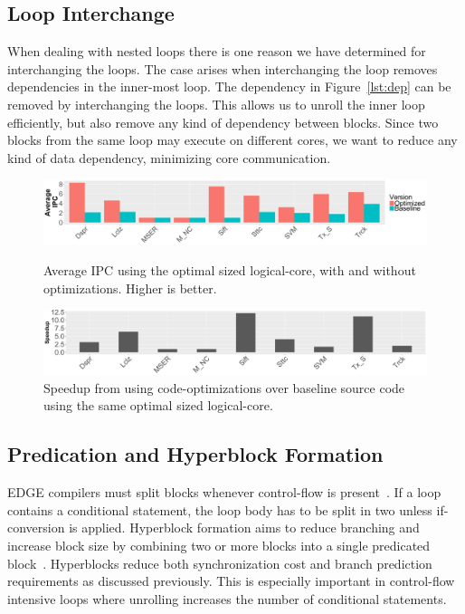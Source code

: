 \subsection{Loop Interchange}
When dealing with nested loops there is one reason we have determined for interchanging the loops.
The case arises when interchanging the loop removes dependencies in the inner-most loop.
The dependency in Figure~\ref{lst:dep} can be removed by interchanging the loops. 
This allows us to unroll the inner loop efficiently, but also remove any kind of dependency between blocks.
Since two blocks from the same loop may execute on different cores, we want to reduce any kind of data dependency, minimizing core communication.

\begin{figure}[t]
     \centering
     \includegraphics[width=\textwidth]{cases-paper/graphics/Exploration/ipc_comp.pdf}
\vspace*{-8mm}
     \caption{Average IPC using the optimal sized logical-core, with and without optimizations. Higher is better.}
     \label{fig:ipccom}
     \vspace{0.5em}
\vspace{5mm}
    \centering
    \includegraphics[width=\textwidth]{cases-paper/graphics/Exploration/comp_speed.pdf}
\vspace*{-8mm}
    \caption{Speedup from using code-optimizations over baseline source code using the same optimal sized logical-core.}
    \label{fig:speedcomp}
\vspace{5mm}
\end{figure}

\subsection{Predication and Hyperblock Formation}
EDGE compilers must split blocks whenever control-flow is present~\cite{smith2006edge}.
If a loop contains a conditional statement, the loop body has to be split in two unless if-conversion is applied.
Hyperblock formation aims to reduce branching and increase block size by combining two or more blocks into a single predicated block~\cite{smith2006edge}.
Hyperblocks reduce both synchronization cost and branch prediction requirements as discussed previously.
This is especially important in control-flow intensive loops where unrolling increases the number of conditional statements.

